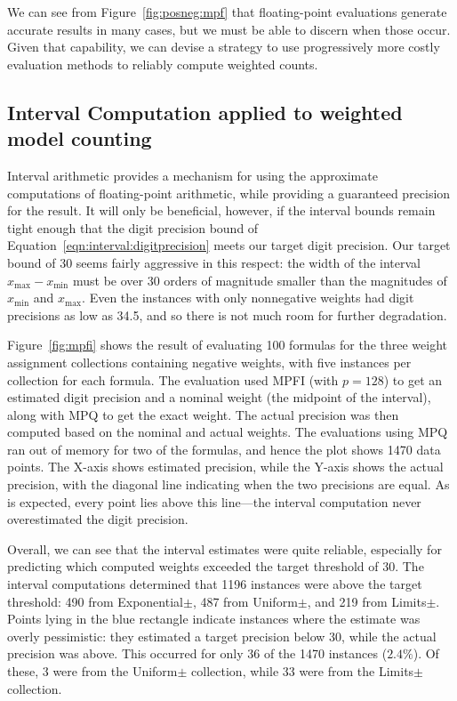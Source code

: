 \documentclass[letterpaper,USenglish,cleveref, autoref, thm-restate]{lipics-v2021}
\newcommand{\xmin}{x_{\textrm{min}}}
\newcommand{\xmax}{x_{\textrm{max}}}
\begin{document}
We can see from Figure~\ref{fig:posneg:mpf} that floating-point
evaluations generate accurate results in many cases, but we must be
able to discern when those occur.  Given that capability, we can
devise a strategy to use progressively more costly evaluation methods
to reliably compute weighted counts.

\subsection{Interval Computation applied to weighted model counting}

Interval arithmetic provides a mechanism for using the approximate
computations of floating-point arithmetic, while providing a
guaranteed precision for the result.  It will only be beneficial,
however, if the interval bounds remain tight enough that the digit
precision bound of Equation~\ref{eqn:interval:digitprecision} meets
our target digit precision.  Our target bound of 30 seems fairly
aggressive in this respect: the width of the interval $\xmax-\xmin$
must be over 30 orders of magnitude smaller than the magnitudes of
$\xmin$ and $\xmax$.  Even the instances with only nonnegative weights
had digit precisions as low as 34.5, and so there is not much
room for further degradation.

Figure~\ref{fig:mpfi} shows the result of evaluating 100 formulas for
the three weight assignment collections containing negative weights,
with five instances per collection for each formula.  
The evaluation used
MPFI (with $p=128$) to get an estimated digit precision and
a nominal weight (the midpoint of the interval), along with MPQ to get
the exact weight.  The actual precision was then computed based on the
nominal and actual weights.  The evaluations using MPQ ran out of
memory for two of the formulas, and hence the plot shows 1470
data points.  The X-axis shows estimated precision, while the Y-axis
shows the actual precision, with the diagonal line indicating when the
two precisions are equal.  As is expected, every point lies above this
line---the interval computation never overestimated the digit
precision.

Overall, we can see that the interval estimates were quite reliable,
especially for predicting which computed weights exceeded the target
threshold of 30.
The
interval computations determined that 1196 instances were
above the target threshold: 490 from \textsf{Exponential$\pm$}, 487 from
\textsf{Uniform$\pm$}, and 219 from \textsf{Limits$\pm$}.
Points lying in the blue rectangle
indicate instances where the estimate was overly pessimistic: they
estimated a target precision below 30, while the actual precision was
above.  This occurred for only 36 of the 1470 instances ($2.4\%$).  Of
these, 3 were from the \textsf{Uniform$\pm$} collection, while 33 were
from the \textsf{Limits$\pm$} collection.  
\end{document}
